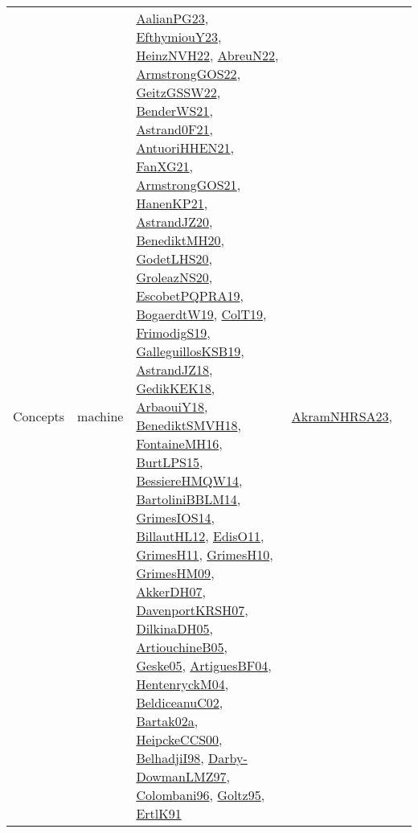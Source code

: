 {\begin{longtable}{lp{3cm}>{\raggedright}p{6cm}>{\raggedright}p{6cm}p{8cm}}
Concepts & machine & \href{papers/AalianPG23.pdf}{AalianPG23}\cite{AalianPG23}, \href{papers/EfthymiouY23.pdf}{EfthymiouY23}\cite{EfthymiouY23}, \href{articles/HeinzNVH22.pdf}{HeinzNVH22}\cite{HeinzNVH22}, \href{articles/AbreuN22.pdf}{AbreuN22}\cite{AbreuN22}, \href{papers/ArmstrongGOS22.pdf}{ArmstrongGOS22}\cite{ArmstrongGOS22}, \href{papers/GeitzGSSW22.pdf}{GeitzGSSW22}\cite{GeitzGSSW22}, \href{papers/BenderWS21.pdf}{BenderWS21}\cite{BenderWS21}, \href{papers/Astrand0F21.pdf}{Astrand0F21}\cite{Astrand0F21}, \href{papers/AntuoriHHEN21.pdf}{AntuoriHHEN21}\cite{AntuoriHHEN21}, \href{articles/FanXG21.pdf}{FanXG21}\cite{FanXG21}, \href{papers/ArmstrongGOS21.pdf}{ArmstrongGOS21}\cite{ArmstrongGOS21}, \href{papers/HanenKP21.pdf}{HanenKP21}\cite{HanenKP21}, \href{articles/AstrandJZ20.pdf}{AstrandJZ20}\cite{AstrandJZ20}, \href{articles/BenediktMH20.pdf}{BenediktMH20}\cite{BenediktMH20}, \href{papers/GodetLHS20.pdf}{GodetLHS20}\cite{GodetLHS20}, \href{papers/GroleazNS20.pdf}{GroleazNS20}\cite{GroleazNS20}, \href{articles/EscobetPQPRA19.pdf}{EscobetPQPRA19}\cite{EscobetPQPRA19}, \href{papers/BogaerdtW19.pdf}{BogaerdtW19}\cite{BogaerdtW19}, \href{papers/ColT19.pdf}{ColT19}\cite{ColT19}, \href{papers/FrimodigS19.pdf}{FrimodigS19}\cite{FrimodigS19}, \href{papers/GalleguillosKSB19.pdf}{GalleguillosKSB19}\cite{GalleguillosKSB19}, \href{papers/AstrandJZ18.pdf}{AstrandJZ18}\cite{AstrandJZ18}, \href{articles/GedikKEK18.pdf}{GedikKEK18}\cite{GedikKEK18}, \href{papers/ArbaouiY18.pdf}{ArbaouiY18}\cite{ArbaouiY18}, \href{papers/BenediktSMVH18.pdf}{BenediktSMVH18}\cite{BenediktSMVH18}, \href{papers/FontaineMH16.pdf}{FontaineMH16}\cite{FontaineMH16}, \href{papers/BurtLPS15.pdf}{BurtLPS15}\cite{BurtLPS15}, \href{papers/BessiereHMQW14.pdf}{BessiereHMQW14}\cite{BessiereHMQW14}, \href{papers/BartoliniBBLM14.pdf}{BartoliniBBLM14}\cite{BartoliniBBLM14}, \href{articles/GrimesIOS14.pdf}{GrimesIOS14}\cite{GrimesIOS14}, \href{papers/BillautHL12.pdf}{BillautHL12}\cite{BillautHL12}, \href{papers/EdisO11.pdf}{EdisO11}\cite{EdisO11}, \href{papers/GrimesH11.pdf}{GrimesH11}\cite{GrimesH11}, \href{papers/GrimesH10.pdf}{GrimesH10}\cite{GrimesH10}, \href{papers/GrimesHM09.pdf}{GrimesHM09}\cite{GrimesHM09}, \href{papers/AkkerDH07.pdf}{AkkerDH07}\cite{AkkerDH07}, \href{papers/DavenportKRSH07.pdf}{DavenportKRSH07}\cite{DavenportKRSH07}, \href{papers/DilkinaDH05.pdf}{DilkinaDH05}\cite{DilkinaDH05}, \href{papers/ArtiouchineB05.pdf}{ArtiouchineB05}\cite{ArtiouchineB05}, \href{papers/Geske05.pdf}{Geske05}\cite{Geske05}, \href{papers/ArtiguesBF04.pdf}{ArtiguesBF04}\cite{ArtiguesBF04}, \href{papers/HentenryckM04.pdf}{HentenryckM04}\cite{HentenryckM04}, \href{papers/BeldiceanuC02.pdf}{BeldiceanuC02}\cite{BeldiceanuC02}, \href{papers/Bartak02a.pdf}{Bartak02a}\cite{Bartak02a}, \href{articles/HeipckeCCS00.pdf}{HeipckeCCS00}\cite{HeipckeCCS00}, \href{articles/BelhadjiI98.pdf}{BelhadjiI98}\cite{BelhadjiI98}, \href{articles/Darby-DowmanLMZ97.pdf}{Darby-DowmanLMZ97}\cite{Darby-DowmanLMZ97}, \href{papers/Colombani96.pdf}{Colombani96}\cite{Colombani96}, \href{papers/Goltz95.pdf}{Goltz95}\cite{Goltz95}, \href{papers/ErtlK91.pdf}{ErtlK91}\cite{ErtlK91} & \href{articles/AkramNHRSA23.pdf}{AkramNHRSA23}\cite{AkramNHRSA23}, 
\end{longtable}}

